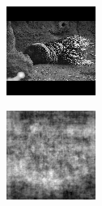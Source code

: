 \begin{figure}[H]
  \begin{subfigure}[t]{0.15\textwidth}
    \includegraphics[width=\linewidth]{img/one-trial/stimulus_3.png}
  \end{subfigure}
  \begin{subfigure}[t]{0.15\textwidth}
    \includegraphics[width=\linewidth]{img/one-trial/prediction_3_lr.png}

\end{subfigure}
\end{figure}
